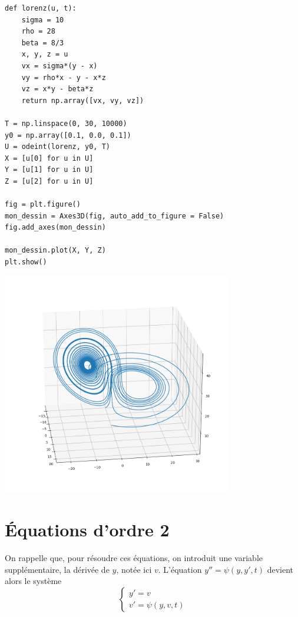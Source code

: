 \begin{Answer}
\begin{lstlisting}
def lorenz(u, t):
    sigma = 10
    rho = 28
    beta = 8/3
    x, y, z = u
    vx = sigma*(y - x)
    vy = rho*x - y - x*z
    vz = x*y - beta*z
    return np.array([vx, vy, vz])

T = np.linspace(0, 30, 10000)
y0 = np.array([0.1, 0.0, 0.1])
U = odeint(lorenz, y0, T)
X = [u[0] for u in U]
Y = [u[1] for u in U]
Z = [u[2] for u in U]

fig = plt.figure()
mon_dessin = Axes3D(fig, auto_add_to_figure = False)
fig.add_axes(mon_dessin)

mon_dessin.plot(X, Y, Z) 
plt.show()
\end{lstlisting}
\begin{center}
\includegraphics[width=10cm]{TP/Images/ED2_Lorenz.png}
\end{center}
\end{Answer}
\newpage
\section{Équations d'ordre 2}
On rappelle que, pour résoudre ces équations, on introduit une variable supplémentaire, la dérivée de $y$, notée ici $v$. L'équation $y''= \psi(y, y', t)$ devient alors le système 
\[\left\{
\begin{matrix}
  y' = v\\
  v' = \psi(y, v, t)
\end{matrix}
\right.\]
